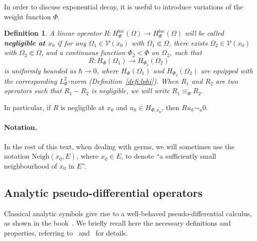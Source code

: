 \documentclass{article}
\newtheorem{defi}[theo]{Definition}
\newcommand{\Vois}{\mathrm{Neigh}}
\newcommand{\loc}{\mathrm{loc}}
\newcommand{\lphi}{L^2_\Phi}
\newcommand{\h}{\hbar}
\newcommand{\hnegl}{\equiv_\Phi}
\begin{document}
In order to discuss exponential decay, it is useful to introduce
variations of the weight function $\Phi$.
\begin{defi}\label{defi:H-negligible}
  A linear operator
  $R:H_{\Phi}^\loc(\Omega) \to H_{\Phi}^\loc(\Omega)$ will be called
  \textbf{negligible at $x_0$} if for any
  $\Omega_1\in\mathcal{V}(x_0)$ with $\Omega_1\Subset\Omega$, there
  exists $\Omega_2\in\mathcal{V}(x_0)$ with $\Omega_2\Subset\Omega$,
  and a continuous function $\Phi_2<\Phi$ on $\Omega_2$, such that
  \[
  R : H_{\Phi}(\Omega_1) \to H_{\Phi_2}(\Omega_2)
  \]
  is uniformly bounded as $\h\to 0$, where $H_{\Phi}(\Omega_1)$ and
  $H_{\Phi_2}(\Omega_2)$ are equipped with the corresponding
  $\lphi$-norm (Definition~\ref{defi:lphi}). When $R_1$ and $R_2$ are
  two operators such that $R_1-R_2$ is negligible, we will write
  $R_1\hnegl R_2$.
\end{defi}
In particular, if $R$ is negligible at $x_0$ and
$u_\h\in H_{\Phi,x_0}$, then $Ru_\h \sim_a 0$.

\paragraph{Notation. } In the rest of this text, when dealing with
germs, we will sometimes use the notation $\Vois(x_0,E)$, where
$x_0\in E$, to denote ``a sufficiently small neighbourhood of $x_0$ in
$E$''.

\subsection{Analytic pseudo-differential operators}
\label{sec:analyt-pseudo-diff}

Classical analytic symbols give rise to a well-behaved
pseudo-differential calculus, as shown in the
book~\cite{sj-asterisque-82}. We briefly recall here the necessary
definitions and properties, referring to~\cite{sj-asterisque-82}
and~\cite{h-sj-minicours} for details.
\end{document}
